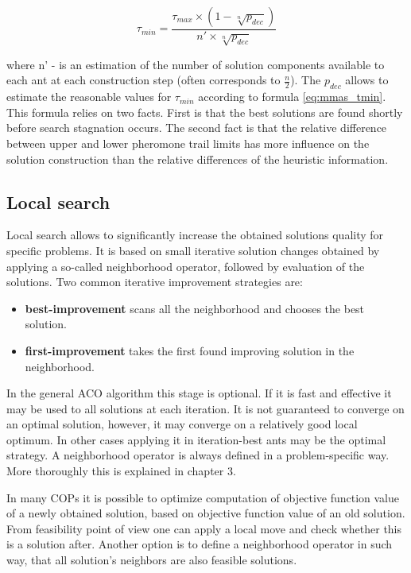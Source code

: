 \documentclass[11pt,a4paper,oneside]{book}
\begin{document}
\begin{equation}
\tau_{min} = \frac{\tau_{max} \times (1 - \sqrt[n]{p_{dec}})}{n' \times \sqrt[n]{p_{dec}}} 
\label{eq:mmas_tmin}
\end{equation}

where n' - is an estimation of the number of solution components available to each ant at each construction step (often corresponds to $\frac{n}{2}$). The $p_{dec}$ allows to estimate the reasonable values for $\tau_{min}$ according to formula \eqref{eq:mmas_tmin}. This formula relies on two facts. First is that the best solutions are found shortly before search stagnation occurs. The second fact is that the relative difference between upper and lower pheromone trail limits has more influence on the solution construction than the relative differences of the heuristic information.

\subsection{Local search}
Local search allows to significantly increase the obtained solutions quality for specific problems. It is based on small iterative solution changes obtained by applying a so-called neighborhood operator, followed by evaluation of the solutions. Two common iterative improvement strategies are:

\begin{itemize}
\item \textbf{best-improvement} scans all the neighborhood and chooses the best solution.
\item \textbf{first-improvement} takes the first found improving solution in the neighborhood.
\end{itemize}


In the general ACO algorithm this stage is optional. If it is fast and effective it may be used to all solutions at each iteration. It is not guaranteed to converge on an optimal solution, however, it may converge on a relatively good local optimum. In other cases applying it in iteration-best ants may be the optimal strategy. A neighborhood operator is always defined in a problem-specific way. More thoroughly this is explained in chapter 3.

In many COPs it is possible to optimize computation of objective function value of a newly obtained solution, based on objective function value of an old solution. From feasibility point of view one can apply a local move and check whether this is a solution after. Another option is to define a neighborhood operator in such way, that all solution's neighbors are also feasible solutions.
\end{document}
